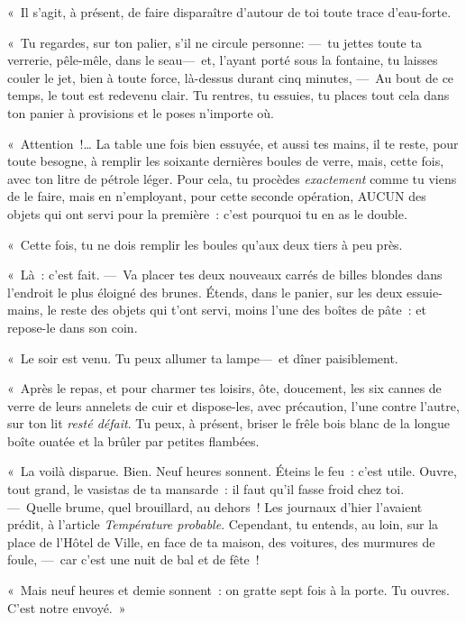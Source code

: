 \documentclass[french,twoside]{book} %
\begin{document}
« Il s’agit, à présent, de faire disparaître d’autour de toi toute trace d’eau-forte.\par
« Tu regardes, sur ton palier, s’il ne circule personne: — tu jettes toute ta verrerie, pêle-mêle, dans le seau— et, l’ayant porté sous la fontaine, tu laisses couler le jet, bien à toute force, là-dessus durant cinq minutes, — Au bout de ce temps, le tout est redevenu clair. Tu rentres, tu essuies, tu places tout cela dans ton panier à provisions et le poses n’importe où.\par
« Attention !… La table une fois bien essuyée, et aussi tes mains, il te reste, pour toute besogne, à remplir les soixante dernières boules de verre, mais, cette fois, avec ton litre de pétrole   léger. Pour cela, tu procèdes \emph{exactement} comme tu viens de le faire, mais en n’employant, pour cette seconde opération, AUCUN des objets qui ont servi pour la première : c’est pourquoi tu en as le double.\par
« Cette fois, tu ne dois remplir les boules qu’aux deux tiers à peu près.\par
« Là : c’est fait. — Va placer tes deux nouveaux carrés de billes blondes dans l’endroit le plus éloigné des brunes. Étends, dans le panier, sur les deux essuie-mains, le reste des objets qui t’ont servi, moins l’une des boîtes de pâte : et repose-le dans son coin.\par
« Le soir est venu. Tu peux allumer ta lampe— et dîner paisiblement.\par
« Après le repas, et pour charmer tes loisirs, ôte, doucement, les six cannes de verre de leurs annelets de cuir et dispose-les, avec précaution, l’une contre l’autre, sur ton lit \emph{resté défait}. Tu peux, à présent, briser le frêle bois blanc de la longue boîte ouatée et la brûler par petites flambées.\par
« La voilà disparue. Bien. Neuf heures sonnent.   Éteins le feu : c’est utile. Ouvre, tout grand, le vasistas de ta mansarde : il faut qu’il fasse froid chez toi. — Quelle brume, quel brouillard, au dehors ! Les journaux d’hier l’avaient prédit, à l’article \emph{Température probable}. Cependant, tu entends, au loin, sur la place de l’Hôtel de Ville, en face de ta maison, des voitures, des murmures de foule, — car c’est une nuit de bal et de fête !\par
« Mais neuf heures et demie sonnent : on gratte sept fois à la porte. Tu ouvres. C’est notre envoyé. »
\end{document}
